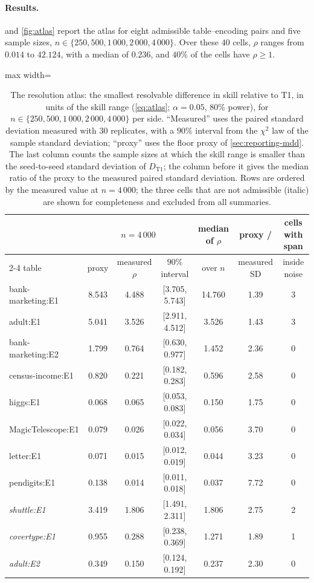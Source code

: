 \documentclass[twoside,11pt]{article}
\theoremstyle{plain}
\theoremstyle{definition}
\theoremstyle{remark}
\begin{document}
\paragraph{Results.}  and \cref{fig:atlas} report the
atlas for eight admissible table--encoding pairs and five sample sizes,
$n \in \{250, 500, 1\,000, 2\,000, 4\,000\}$. Over these $40$ cells, $\rho$
ranges from $0.014$ to $42.124$, with a median of $0.236$, and $40\%$ of the
cells have $\rho \geq 1$.

\begin{table}[htbp]
\centering
\small
\begin{adjustbox}{max width=\textwidth}
\begin{tabular}{lcccccc}
\toprule
& \multicolumn{3}{c}{$n = 4\,000$} & median of $\rho$ & proxy / & cells with span \\
\cmidrule(lr){2-4}
table & proxy & measured $\rho$ & $90\%$ interval & over $n$ & measured SD & inside noise \\
\midrule
bank-marketing:E1 & 8.543 & 4.488 & [3.705, 5.743] & 14.760 & 1.39 & 3 \\
adult:E1          & 5.041 & 3.526 & [2.911, 4.512] & 3.526 & 1.43 & 3 \\
bank-marketing:E2 & 1.799 & 0.764 & [0.630, 0.977] & 1.452 & 2.36 & 0 \\
census-income:E1  & 0.820 & 0.221 & [0.182, 0.283] & 0.596 & 2.58 & 0 \\
higgs:E1          & 0.068 & 0.065 & [0.053, 0.083] & 0.150 & 1.75 & 0 \\
MagicTelescope:E1 & 0.079 & 0.026 & [0.022, 0.034] & 0.056 & 3.70 & 0 \\
letter:E1         & 0.071 & 0.015 & [0.012, 0.019] & 0.044 & 3.23 & 0 \\
pendigits:E1      & 0.138 & 0.014 & [0.011, 0.018] & 0.037 & 7.72 & 0 \\
\midrule
\textit{shuttle:E1} & 3.419 & 1.806 & [1.491, 2.311] & 1.806 & 2.75 & 2 \\
\textit{covertype:E1} & 0.955 & 0.288 & [0.238, 0.369] & 1.271 & 1.89 & 1 \\
\textit{adult:E2} & 0.349 & 0.150 & [0.124, 0.192] & 0.237 & 2.30 & 0 \\
\bottomrule
\end{tabular}
\end{adjustbox}
\caption{The resolution atlas: the smallest resolvable difference in skill
relative to T1, in units of the skill range (\cref{eq:atlas}; $\alpha = 0.05$,
80\% power), for $n \in \{250, 500, 1\,000, 2\,000, 4\,000\}$ per side.
``Measured'' uses the paired standard deviation measured with $30$
replicates, with a $90\%$ interval from the $\chi^{2}$ law of the sample
standard deviation; ``proxy'' uses the floor proxy of
\cref{sec:reporting-mdd}. The last column counts the sample sizes at which
the skill range is smaller than the seed-to-seed standard deviation of
$D_{\mathrm{T1}}$; the column before it gives the median ratio of the proxy
to the measured paired standard deviation. Rows are ordered by the measured value at $n = 4\,000$;
the three cells that are not admissible (italic) are shown for completeness
and excluded from all summaries.}\label{tab:atlas}
\end{table}
\end{document}
